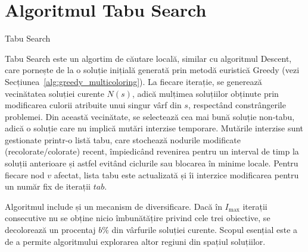 \section{Algoritmul Tabu Search}


\begin{algorithm}[H]
\caption{Tabu Search}\label{alg:tabu_search}
\begin{algorithmic}[1]
\small
{}
     
    \Else{}
    \EndIf{}
    \EndIf{}
\EndWhile{}
\end{algorithmic}
\end{algorithm}
 Tabu Search este un algortim de căutare locală, similar cu algoritmul Descent, care pornește de la o soluție inițială generată prin metodă euristică Greedy (vezi Secțiunea~\ref{alg:greedy_multicoloring}). La fiecare iterație, se generează vecinătatea soluției curente $N(s)$, adică mulțimea soluțiilor obținute prin modificarea culorii atribuite unui singur vârf din $s$, respectând constrângerile problemei. Din această vecinătate, se selectează cea mai bună soluție non-tabu, adică o soluție care nu implică mutări interzise temporare. Mutările interzise sunt gestionate printr-o listă tabu, care stochează nodurile modificate (recolorate/colorate) recent, împiedicând revenirea pentru un interval de timp la soluții anterioare și astfel evitând ciclurile sau blocarea în minime locale. Pentru fiecare nod $v$ afectat, lista tabu este actualizată și îi interzice modificarea pentru un număr fix de iterații $tab$.

 Algoritmul include și un mecanism de diversificare. Dacă în $I_{\max}$ iterații consecutive nu se obține nicio îmbunătățire privind cele trei obiective, se decolorează  un procentaj $b\%$ din vârfurile soluției curente. Scopul esențial este a de a permite algoritmului explorarea altor regiuni din spațiul soluțiilor.


